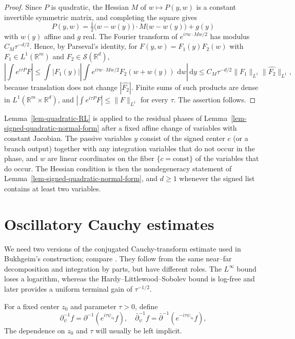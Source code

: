 \documentclass[a4paper,11pt]{article}
\newcommand{\pr}{\partial}
\newcommand{\psiz}{\psi_{z_0}}
\newcommand{\R}{\mathbb{R}}
\newcommand{\dd}{\,\text{d}}
\theoremstyle{plain}
\theoremstyle{definition}
\theoremstyle{remark}
\begin{document}
\begin{proof}
Since $P$ is quadratic, the Hessian $M$ of $w\mapsto P(y,w)$ is a constant
invertible symmetric matrix, and completing the square gives
\[
        P(y,w)=\tfrac12\bigl(w-w(y)\bigr)\cdot M\bigl(w-w(y)\bigr)+g(y)
\]
with $w(y)$ affine and $g$ real.  The Fourier transform of
$e^{i\tau w\cdot Mw/2}$ has modulus $C_M\tau^{-d/2}$.  Hence, by Parseval's
identity, for $F(y,w)=F_1(y)F_2(w)$ with $F_1\in L^1(\R^m)$ and
$F_2\in\mathcal S(\R^d)$,
\[
        \left|\int e^{i\tau P}F\right|
        \le \int|F_1(y)|
        \left|\int e^{i\tau w\cdot Mw/2}F_2(w+w(y))\,\dd w\right|\dd y
        \le C_M\tau^{-d/2}\|F_1\|_{L^1}\|\widehat{F_2}\|_{L^1},
\]
because translation does not change $|\widehat{F_2}|$.  Finite sums of such
products are dense in $L^1(\R^m\times\R^d)$, and
$|\int e^{i\tau P}F|\le\|F\|_{L^1}$ for every $\tau$.  The assertion follows.
\end{proof}

Lemma~\ref{lem-quadratic-RL} is applied to the residual phases of
Lemma~\ref{lem-signed-quadratic-normal-form} after a fixed affine change of
variables with constant Jacobian.  The passive variables $y$ consist of the
signed center $c$ (or a branch output) together with any integration variables
that do not occur in the phase, and $w$ are linear coordinates on the fiber
$\{c=\mathrm{const}\}$ of the variables that do occur.  The Hessian condition is
then the nondegeneracy statement of
Lemma~\ref{lem-signed-quadratic-normal-form}, and $d\ge1$ whenever the signed
list contains at least two variables.


\section{Oscillatory Cauchy estimates}\label{sec:oscillatory-cauchy}

We need two versions of the conjugated Cauchy-transform estimate used in Bukhgeim's construction; compare \cite{BlastenTzouWang2020}.  They follow from the same near--far decomposition and integration by parts, but have different roles.  The $L^\infty$ bound loses a logarithm, whereas the Hardy--Littlewood--Sobolev bound is log-free and later provides a uniform terminal gain of $\tau^{-1/2}$.

For a fixed center $z_0$ and parameter $\tau>0$, define
\begin{equation}
\pr_\psi^{-1}f=\pr^{-1}(e^{i\tau\psiz}f), \quad\bar\pr_\psi^{-1}f=\bar\pr^{-1}(e^{-i\tau\psiz}f),
\end{equation}
The dependence on $z_0$ and $\tau$ will usually be left implicit.
\end{document}
